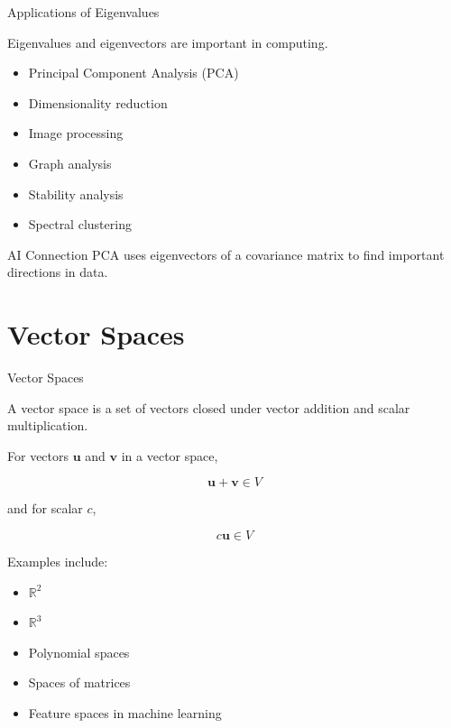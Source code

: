 \documentclass[aspectratio=169]{beamer}
\begin{document}
\begin{frame}{Applications of Eigenvalues}
\small

Eigenvalues and eigenvectors are important in computing.

\begin{itemize}
\item Principal Component Analysis (PCA)
\item Dimensionality reduction
\item Image processing
\item Graph analysis
\item Stability analysis
\item Spectral clustering
\end{itemize}

\begin{block}{AI Connection}
PCA uses eigenvectors of a covariance matrix to find important directions in data.
\end{block}

\end{frame}

\section{Vector Spaces}

\begin{frame}{Vector Spaces}
\small

A vector space is a set of vectors closed under vector addition and scalar multiplication.

For vectors $\mathbf{u}$ and $\mathbf{v}$ in a vector space,

$$
\mathbf{u}+\mathbf{v}\in V
$$

and for scalar $c$,

$$
c\mathbf{u}\in V
$$

Examples include:

\begin{itemize}
\item $\mathbb{R}^2$
\item $\mathbb{R}^3$
\item Polynomial spaces
\item Spaces of matrices
\item Feature spaces in machine learning
\end{itemize}

\end{frame}
\end{document}
